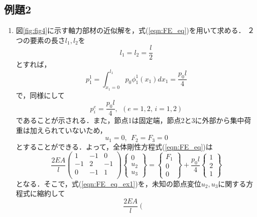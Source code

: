 \documentclass[10pt,a4j]{jarticle}
\begin{document}
\subsection{例題2}
\begin{enumerate}
\item
図\ref{fig:fig4}に示す軸力部材の近似解を，式(\ref{eqn:FE_eq})を用いて求める．
２つの要素の長さ$l_1,l_2$を
\begin{equation}
	l_1=l_2=\frac{l}{2}
	\label{eqn:l1_l2}
\end{equation}
とすれば，
\begin{equation}
	p^1_1=\int_{x_1=0}^{l_1}p_0 \phi^1_1(x_1)dx_1=\frac{p_0l}{4}
	\label{eqn:}
\end{equation}
で，同様にして
\begin{equation}
	p^e_i=\frac{p_0l}{4}, \ \ (e=1,2,\, i=1,2)
	\label{eqn:}
\end{equation}
であることが示される．また，節点1は固定端，節点2と3に外部から集中荷重は加えられていないため，
\begin{equation}
	u_1=0, \ \ F_2=F_3=0
\end{equation}
とすることができる．よって，全体剛性方程式(\ref{eqn:FE_eq})は
\begin{equation}
	\frac{2EA}{l}
	\left(
	\begin{array}{ccc}
		1 & -1  & 0 \\
		-1 & 2 & -1 \\
		0 & -1 & 1  \\
	\end{array}
	\right)
	\left\{
	\begin{array}{c}
		0 \\
		u_2 \\
		u_3
	\end{array}
	\right\}
	=
	\left\{
	\begin{array}{c}
		F_1 \\
		0  \\
		0  
	\end{array}
	\right\}
	+
	\frac{p_0l}{4}
	\left\{
	\begin{array}{c}
		1 \\
		2 \\
		1	
	\end{array}
	\right\}
	\label{eqn:FE_eq_ex1}
\end{equation}
となる．そこで，式(\ref{eqn:FE_eq_ex1})を，未知の節点変位$u_2,u_3$に関する方程式に縮約して
\begin{equation}
	\frac{2EA}{l}
	\left(
	\begin{array}{cc}

\end{array}
\end{equation}
\end{enumerate}
\end{document}
